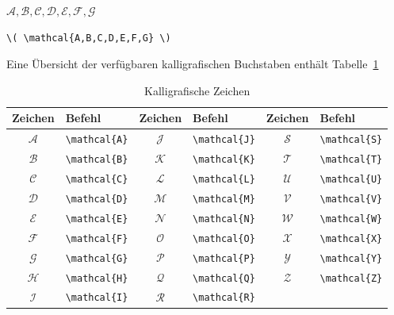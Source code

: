\documentclass[a4paper,10pt,twoside]{scrbook}
\begin{document}
\begin{minipage}[c]{.4\textwidth}
\setlength{\parskip}{1em}
\centering
\( \mathcal{A,B,C,D,E,F,G} \)
\end{minipage}
\hfill
\begin{minipage}[c]{.58\textwidth}
\setlength{\parskip}{1em}
\begin{lstlisting}[label=mathcalbeispiel, style=customlatex]
\( \mathcal{A,B,C,D,E,F,G} \)
\end{lstlisting}
\end{minipage}

Eine Übersicht der verfügbaren kalligrafischen Buchstaben
enthält Tabelle~\ref{Tabelle_Kalligrafische_Buchstaben3}  


\begin{table}[h!tb]
\centering
\caption{Kalligrafische Zeichen}
\label{Tabelle_Kalligrafische_Buchstaben3}       %
\begin{tabular}{clclcl}
\hline
Zeichen & Befehl & Zeichen & Befehl & Zeichen & Befehl \\
\hline
\(\mathcal{A}\) & \texttt{\textbackslash mathcal\{A\}} &
\(\mathcal{J}\) & \texttt{\textbackslash mathcal\{J\}} & 
\(\mathcal{S}\) & \texttt{\textbackslash mathcal\{S\}} \\
\(\mathcal{B}\) & \texttt{\textbackslash mathcal\{B\}} & 
\(\mathcal{K}\) & \texttt{\textbackslash mathcal\{K\}} &
\(\mathcal{T}\) & \texttt{\textbackslash mathcal\{T\}} \\
\(\mathcal{C}\) & \texttt{\textbackslash mathcal\{C\}} & 
\(\mathcal{L}\) & \texttt{\textbackslash mathcal\{L\}} &
\(\mathcal{U}\) & \texttt{\textbackslash mathcal\{U\}} \\
\(\mathcal{D}\) & \texttt{\textbackslash mathcal\{D\}} & 
\(\mathcal{M}\) & \texttt{\textbackslash mathcal\{M\}} &
\(\mathcal{V}\) & \texttt{\textbackslash mathcal\{V\}}\\
\(\mathcal{E}\) & \texttt{\textbackslash mathcal\{E\}} & 
\(\mathcal{N}\) & \texttt{\textbackslash mathcal\{N\}} &
\(\mathcal{W}\) & \texttt{\textbackslash mathcal\{W\}}\\
\(\mathcal{F}\) & \texttt{\textbackslash mathcal\{F\}} & 
\(\mathcal{O}\) & \texttt{\textbackslash mathcal\{O\}} &
\(\mathcal{X}\) & \texttt{\textbackslash mathcal\{X\}}\\
\(\mathcal{G}\) & \texttt{\textbackslash mathcal\{G\}} & 
\(\mathcal{P}\) & \texttt{\textbackslash mathcal\{P\}} &
\(\mathcal{Y}\) & \texttt{\textbackslash mathcal\{Y\}}\\
\(\mathcal{H}\) & \texttt{\textbackslash mathcal\{H\}} &
\(\mathcal{Q}\) & \texttt{\textbackslash mathcal\{Q\}} &
\(\mathcal{Z}\) & \texttt{\textbackslash mathcal\{Z\}}\\
\(\mathcal{I}\) & \texttt{\textbackslash mathcal\{I\}} &
\(\mathcal{R}\) & \texttt{\textbackslash mathcal\{R\}} & 
& \\
\hline
\end{tabular}
\end{table}
\end{document}
